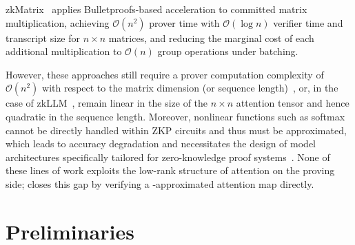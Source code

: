 \documentclass[sigconf,anonymous,review,balance=false]{acmart}
\newcommand{\rev}[1]{{\color{magenta}#1}}
\begin{document}
zkMatrix~\cite{zkMatrix} applies Bulletproofs-based acceleration to committed matrix multiplication, \rev{achieving $\mathcal{O}(n^2)$ prover time with $\mathcal{O}(\log n)$ verifier time and transcript size for $n \times n$ matrices, and reducing the marginal cost of each additional multiplication to $\mathcal{O}(n)$ group operations under batching.}


However, these approaches still require a prover computation complexity of $\mathcal{O}(n^2)$ with respect to the matrix dimension (or sequence length)~\cite{Thaler, zkCNN, vCNN, pvCNN, zkML, zkMatrix}, \rev{or, in the case of zkLLM~\cite{zkLLM}, remain linear in the size of the $n \times n$ attention tensor and hence quadratic in the sequence length}. Moreover, nonlinear functions such as softmax cannot be directly handled within ZKP circuits and thus must be approximated, which leads to accuracy degradation and necessitates the design of model architectures specifically tailored for zero-knowledge proof systems~\cite{zkVC}.
\rev{None of these lines of work exploits the low-rank structure of attention on the proving side; \name closes this gap by verifying a \nystrom-approximated attention map directly.}

\section{Preliminaries}
\label{sec:preliminaries}
\end{document}
